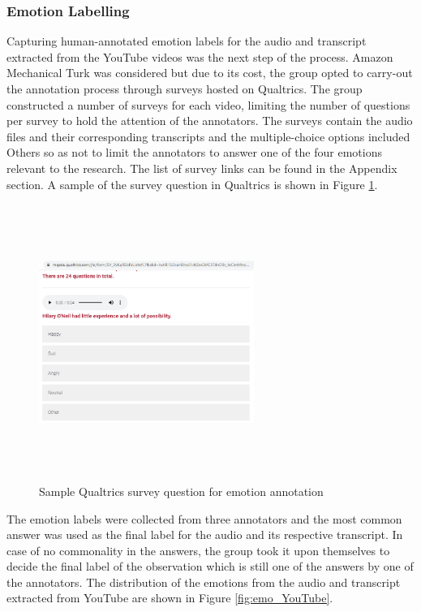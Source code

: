 \documentclass{article}
\newenvironment{subs}
  {\adjustwidth{3em}{0pt}}
  {\endadjustwidth}
\begin{document}
\begin{subs}
\subsubsection*{Emotion Labelling}
Capturing human-annotated emotion labels for the audio and transcript extracted from the YouTube videos was the next step of the process. Amazon Mechanical Turk was considered but due to its cost, the group opted to carry-out the annotation process through surveys hosted on Qualtrics. The group constructed a number of surveys for each video, limiting the number of questions per survey to hold the attention of the annotators. The surveys contain the audio files and their corresponding transcripts and the multiple-choice options included Others so as not to limit the annotators to answer one of the four emotions relevant to the research. The list of survey links can be found in the Appendix section. A sample of the survey question in Qualtrics is shown in Figure \ref{fig:qualtrics_sample}.
    
    \begin{figure}[H]
        \centering
        \includegraphics[width=7cm,height=9cm,keepaspectratio]{Images/Qualtrics_Survey.png}
        \caption{Sample Qualtrics survey question for emotion annotation}
        \label{fig:qualtrics_sample}
    \end{figure}
    
The emotion labels were collected from three annotators and the most common answer was used as the final label for the audio and its respective transcript. In case of no commonality in the answers, the group took it upon themselves to decide the final label of the observation which is still one of the answers by one of the annotators. The distribution of the emotions from the audio and transcript extracted from YouTube are shown in Figure \ref{fig:emo_YouTube}.
    

\end{subs}
\end{document}
